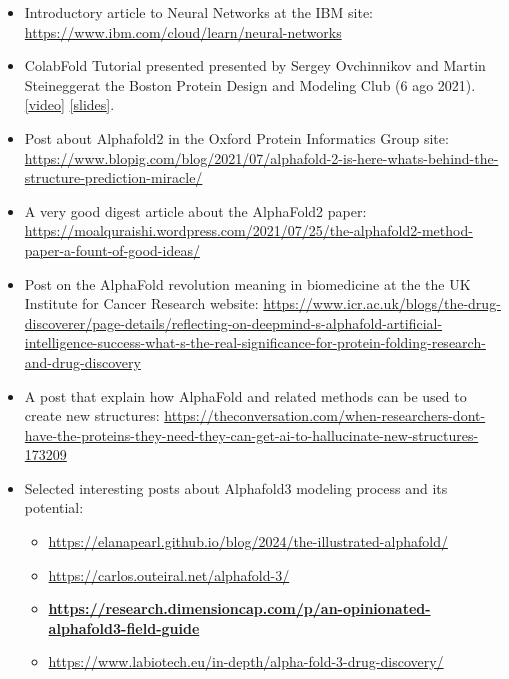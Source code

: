 \documentclass[
]{scrbook}
\begin{document}
\begin{itemize}
\item
  Introductory article to Neural Networks at the IBM site:
  \url{https://www.ibm.com/cloud/learn/neural-networks}
\item
  ColabFold Tutorial presented presented by Sergey Ovchinnikov and
  Martin Steineggerat the Boston Protein Design and Modeling Club (6 ago
  2021). \href{https://www.youtube.com/watch?v=Rfw7thgGTwI}{{[}video{]}}
  \href{https://docs.google.com/presentation/d/1mnffk23ev2QMDzGZ5w1skXEadTe54l8-Uei6ACce8eI}{{[}slides{]}}.
\item
  Post about Alphafold2 in the Oxford Protein Informatics Group site:
  \url{https://www.blopig.com/blog/2021/07/alphafold-2-is-here-whats-behind-the-structure-prediction-miracle/}
\item
  A very good digest article about the AlphaFold2 paper:
  \url{https://moalquraishi.wordpress.com/2021/07/25/the-alphafold2-method-paper-a-fount-of-good-ideas/}
\item
  Post on the AlphaFold revolution meaning in biomedicine at the the UK
  Institute for Cancer Research website:
  \url{https://www.icr.ac.uk/blogs/the-drug-discoverer/page-details/reflecting-on-deepmind-s-alphafold-artificial-intelligence-success-what-s-the-real-significance-for-protein-folding-research-and-drug-discovery}
\item
  A post that explain how AlphaFold and related methods can be used to
  create new structures:
  \url{https://theconversation.com/when-researchers-dont-have-the-proteins-they-need-they-can-get-ai-to-hallucinate-new-structures-173209}
\item
  Selected interesting posts about Alphafold3 modeling process and its
  potential:

  \begin{itemize}
  \item
    \url{https://elanapearl.github.io/blog/2024/the-illustrated-alphafold/}
  \item
    \url{https://carlos.outeiral.net/alphafold-3/}
  \item
    \href{https://research.dimensioncap.com/p/an-opinionated-alphafold3-field-guide}{\textbf{https://research.dimensioncap.com/p/an-opinionated-alphafold3-field-guide}}
  \item
    \url{https://www.labiotech.eu/in-depth/alpha-fold-3-drug-discovery/}
  \end{itemize}
\end{itemize}
\end{document}
